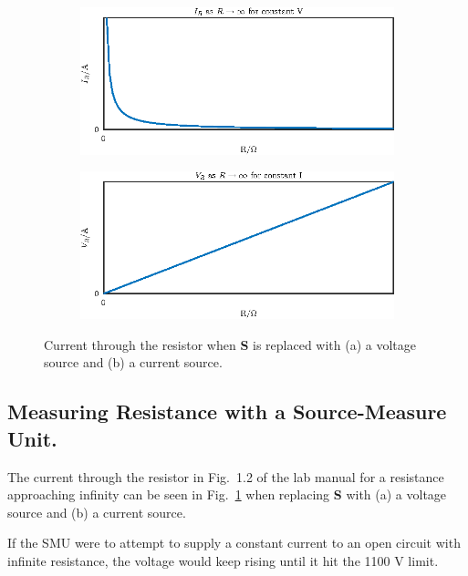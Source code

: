 \begin{figure}
    \center
    \begin{subfigure}{0.8\textwidth}
        \center
        \includegraphics{prelab-1-1-2-1.eps}
        \caption{}
    \end{subfigure}

    \begin{subfigure}{0.8\textwidth}
        \center
        \includegraphics{prelab-1-1-2-2.eps}
        \caption{}
    \end{subfigure}
    \caption{Current through the resistor when \textbf{S} is replaced with (a) a voltage source and (b)
a current source.}
    \label{fig:qualia}
\end{figure}

\subsection{Measuring Resistance with a Source-Measure Unit.}
The current through the resistor in Fig.~1.2 of the lab manual for a resistance approaching
infinity can be seen in Fig.~\ref{fig:qualia} when replacing \textbf{S} with (a) a voltage source
and (b) a current source.

If the SMU were to attempt to supply a constant current to an open circuit with infinite resistance,
the voltage would keep rising until it hit the 1100 V limit.

